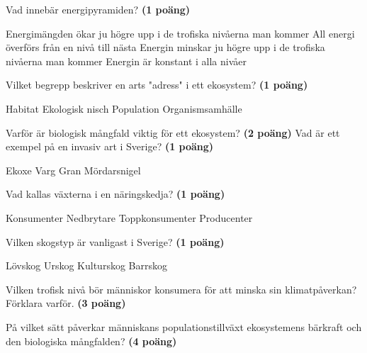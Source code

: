 \documentclass[a4paper,12pt]{exam}
\begin{document}
\begin{questions}
\question Vad innebär energipyramiden? \textbf{(1 poäng)}
\vspace{5mm}
\begin{checkboxes}
    \choice Energimängden ökar ju högre upp i de trofiska nivåerna man kommer
    \choice All energi överförs från en nivå till nästa
    \CorrectChoice Energin minskar ju högre upp i de trofiska nivåerna man kommer
    \choice Energin är konstant i alla nivåer
\end{checkboxes}
\vspace{10mm}

\question Vilket begrepp beskriver en arts "adress" i ett ekosystem? \textbf{(1 poäng)}
\vspace{5mm}
\begin{checkboxes}
    \CorrectChoice Habitat
    \choice Ekologisk nisch
    \choice Population
    \choice Organismsamhälle
\end{checkboxes}
\break
\question Varför är biologisk mångfald viktig för ett ekosystem? \textbf{(2 poäng)}
\vspace{30mm}
\question Vad är ett exempel på en invasiv art i Sverige? \textbf{(1 poäng)}
\vspace{5mm}
\begin{checkboxes}
    \choice Ekoxe
    \choice Varg
    \choice Gran
    \CorrectChoice Mördarsnigel
\end{checkboxes}
\vspace{10mm}

\question Vad kallas växterna i en näringskedja? \textbf{(1 poäng)}
\vspace{5mm}
\begin{checkboxes}
    \choice Konsumenter
    \choice Nedbrytare
    \choice Toppkonsumenter
    \CorrectChoice Producenter
\end{checkboxes}
\vspace{10mm}

\question Vilken skogstyp är vanligast i Sverige? \textbf{(1 poäng)}
\vspace{5mm}
\begin{checkboxes}
    \choice Lövskog
    \choice Urskog
    \choice Kulturskog
    \CorrectChoice Barrskog
\end{checkboxes}
\vspace{10mm}

\break

\vspace{5mm} %
\begin{center}
\end{center}

\question Vilken trofisk nivå bör människor konsumera för att minska sin klimatpåverkan? Förklara varför. \textbf{(3 poäng)}
\vspace{90mm}

\question På vilket sätt påverkar människans populationstillväxt ekosystemens bärkraft och den biologiska mångfalden? \textbf{(4 poäng)}
\vspace{40mm}

\end{questions}
\end{document}
